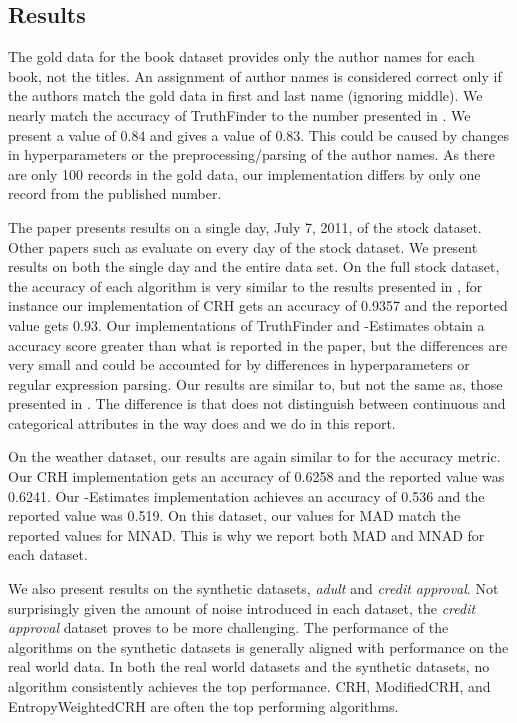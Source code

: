 \documentclass{acm_proc_article-sp}
\begin{document}
\subsection{Results} \label{sec:results}

The gold data for the book dataset provides only the author names for each book, not the titles. An assignment of author names is considered correct only if the authors  match the gold data in first and last name (ignoring middle). We nearly match the accuracy of {\sc TruthFinder } to the number presented in \cite{dong:integrating}. We present a value of $0.84$ and \cite{dong:integrating} gives a value of $0.83$. This could be caused by changes in hyperparameters or the preprocessing/parsing of the author names. As there are only 100 records in the gold data, our implementation differs by only one record from the published number. 

The paper \cite{li:truth} presents results on a single day, July 7, 2011, of the stock dataset. Other papers such as \cite{li:resolving} evaluate on every day of the stock dataset. We present results on both the single day and the entire data set. On the full stock dataset, the accuracy of each algorithm is very similar to the results presented in \cite{li:resolving}, for instance our implementation of CRH gets an accuracy of 0.9357 and the reported value gets 0.93. Our implementations of {\sc TruthFinder} and {-Estimates} obtain a accuracy score greater than what is reported in the paper, but the differences are very small and could be accounted for by differences in hyperparameters or regular expression parsing. Our results are similar to, but not the same as, those presented in \cite{li:truth}. The difference is that \cite{li:truth} does not distinguish between continuous and categorical attributes in the way \cite{li:resolving} does and we do in this report.  

On the weather dataset, our results are again similar to \cite{li:truth} for the accuracy  metric. Our {\sc CRH} implementation gets an accuracy of 0.6258 and the reported value was 0.6241. Our {-Estimates} implementation  achieves an accuracy of 0.536 and the reported value was 0.519. On this dataset, our values for MAD match the reported values for MNAD. This is why we report both MAD and MNAD for each dataset. 

We also present results on the synthetic datasets, \emph{adult} and \emph{credit approval}. Not surprisingly given the amount of noise introduced in each dataset, the \emph{credit approval} dataset proves to be more challenging. The performance of the algorithms on the synthetic datasets is generally aligned with performance on the real world data. In both the real world datasets and the synthetic datasets, no algorithm consistently achieves the top performance. {\sc CRH}, {\sc ModifiedCRH}, and {\sc EntropyWeightedCRH} are often the top performing algorithms.   
\end{document}
